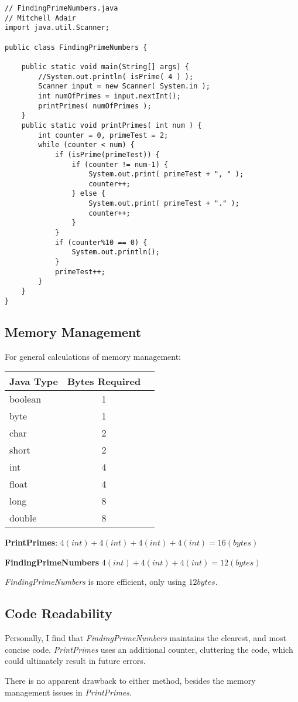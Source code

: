 \documentclass[12pt]{article}
\begin{document}
\begin{lstlisting}
// FindingPrimeNumbers.java
// Mitchell Adair
import java.util.Scanner;

public class FindingPrimeNumbers {

	public static void main(String[] args) {
		//System.out.println( isPrime( 4 ) );
		Scanner input = new Scanner( System.in );
		int numOfPrimes = input.nextInt();
		printPrimes( numOfPrimes );
	}
	public static void printPrimes( int num ) {
		int counter = 0, primeTest = 2;
		while (counter < num) {
			if (isPrime(primeTest)) {
				if (counter != num-1) {
					System.out.print( primeTest + ", " );
					counter++;
				} else {
					System.out.print( primeTest + "." );
					counter++;
				}
			}
			if (counter%10 == 0) {
				System.out.println();
			}
			primeTest++;
		}
	}
}
\end{lstlisting}
\newpage
\subsection{Memory Management}
For general calculations of memory management: 

\begin{center}
\begin{tabular}{l c r}
Java Type & Bytes Required \\ \hline \hline
boolean & 1 \\
byte & 1 \\ \hline
char & 2 \\
short & 2 \\ \hline
int & 4 \\
float & 4 \\ \hline
long & 8 \\
double & 8\\
\end{tabular}
\end{center}

\textbf{PrintPrimes}: $4(int) + 4(int) + 4(int) + 4(int) = 16(bytes)$

\textbf{FindingPrimeNumbers} $4(int) + 4(int) + 4(int) = 12(bytes)$ 

\textit{FindingPrimeNumbers} is more efficient, only using $12 bytes$.  
\subsection{Code Readability}
Personally, I find that \textit{FindingPrimeNumbers} maintains the clearest, and most concise code.  \textit{PrintPrimes} uses an additional counter, cluttering the code, which could ultimately result in future errors.

There is no apparent drawback to either method, besides the memory management issues in \textit{PrintPrimes}.
\end{document}
